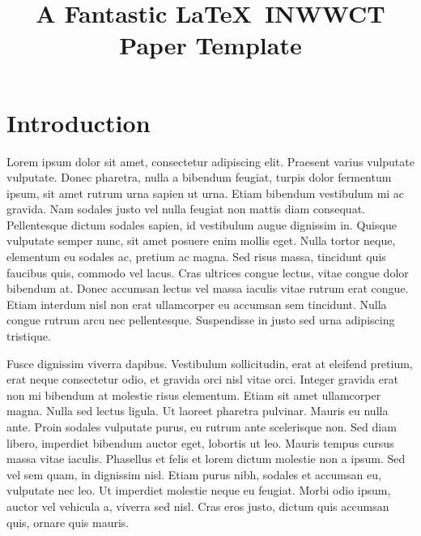 \documentclass{inwwct}
\begin{document}
\title{A Fantastic \LaTeX~INWWCT Paper Template}

\author{
}


\maketitle

\section{Introduction}

Lorem ipsum dolor sit amet, consectetur adipiscing elit. Praesent varius vulputate vulputate. Donec pharetra, nulla a bibendum
feugiat, turpis dolor fermentum ipsum, sit amet rutrum urna sapien ut urna. Etiam bibendum vestibulum mi ac gravida. Nam sodales
justo vel nulla feugiat non mattis diam consequat. Pellentesque dictum sodales sapien, id vestibulum augue dignissim in. Quisque
vulputate semper nunc, sit amet posuere enim mollis eget. Nulla tortor neque, elementum eu sodales ac, pretium ac magna. Sed risus
massa, tincidunt quis faucibus quis, commodo vel lacus. Cras ultrices congue lectus, vitae congue dolor bibendum at. Donec
accumsan lectus vel massa iaculis vitae rutrum erat congue. Etiam interdum nisl non erat ullamcorper eu accumsan sem tincidunt.
Nulla congue rutrum arcu nec pellentesque. Suspendisse in justo sed urna adipiscing tristique.

Fusce dignissim viverra dapibus. Vestibulum sollicitudin, erat at eleifend pretium, erat neque consectetur odio, et gravida orci
nisl vitae orci. Integer gravida erat non mi bibendum at molestie risus elementum. Etiam sit amet ullamcorper magna. Nulla sed
lectus ligula. Ut laoreet pharetra pulvinar. Mauris eu nulla ante. Proin sodales vulputate purus, eu rutrum ante scelerisque non.
Sed diam libero, imperdiet bibendum auctor eget, lobortis ut leo. Mauris tempus cursus massa vitae iaculis. Phasellus et felis et
lorem dictum molestie non a ipsum. Sed vel sem quam, in dignissim nisl. Etiam purus nibh, sodales et accumsan eu, vulputate nec
leo. Ut imperdiet molestie neque eu feugiat. Morbi odio ipsum, auctor vel vehicula a, viverra sed nisl. Cras eros justo, dictum
quis accumsan quis, ornare quis mauris.
\end{document}
